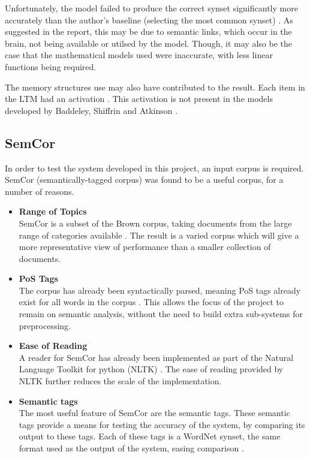 \documentclass[]{article}
\begin{document}
Unfortunately, the model failed to produce the correct synset significantly more accurately than the author's baseline (selecting the most common synset) \cite{MattBurkePrevious}. As suggested in the report, this may be due to semantic links, which occur in the brain, not being available or utilsed by the model. Though, it may also be the case that the mathematical models used were inaccurate, with less linear functions being required.

The memory structures use may also have contributed to the result. Each item in the LTM had an activation \cite{MattBurkePrevious}. This activation is not present in the models developed by Baddeley, Shiffrin and Atkinson \cite{MemoryBaddeleyEysenkAnderson, ControlProcessesSTMAtkinson}.

\subsection{SemCor}
\label{sec:SEMCOR}
\cite{SEMCOR}
In order to test the system developed in this project, an input corpus is required. SemCor (semantically-tagged corpus) was found to be a useful corpus, for a number of reasons.

\begin{itemize}
	\item \textbf{Range of Topics} \\
	SemCor is a subset of the Brown corpus, taking documents from the large range of categories available \cite{SEMCOR}. The result is a varied corpus which will give a more representative view of performance than a smaller collection of documents.
	
	\item \textbf{PoS Tags} \\
	The corpus has already been syntactically parsed, meaning PoS tags already exist for all words in the corpus \cite{SEMCOR}. This allows the focus of the project to remain on semantic analysis, without the need to build extra sub-systems for preprocessing.
	
		\item \textbf{Ease of Reading} \\
	A reader for SemCor has already been implemented as part of the Natural Language Toolkit for python (NLTK) \cite{NLTK}. The ease of reading provided by NLTK further reduces the scale of the implementation.
	
	\item \textbf{Semantic tags} \\
	The most useful feature of SemCor are the semantic tags. These semantic tags provide a means for testing the accuracy of the system, by comparing its output to these tags. Each of these tags is a WordNet synset, the same format used as the output of the system, easing comparison \cite{SEMCOR}.
\end{itemize}
\end{document}
